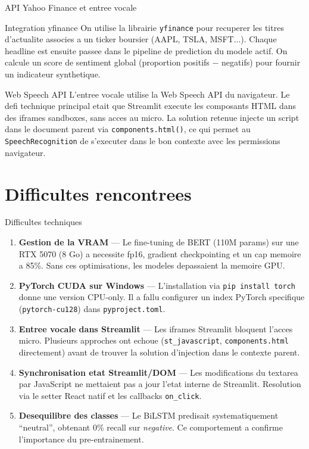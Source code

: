 \documentclass[aspectratio=169, 11pt]{beamer}
\begin{document}
\begin{frame}{API Yahoo Finance et entree vocale}
  \begin{block}{Integration yfinance}
    On utilise la librairie \texttt{yfinance} pour recuperer les titres d'actualite
    associes a un ticker boursier (AAPL, TSLA, MSFT...). Chaque headline est ensuite
    passee dans le pipeline de prediction du modele actif. On calcule un score de
    sentiment global (proportion positifs $-$ negatifs) pour fournir un indicateur
    synthetique.
  \end{block}
  \vspace{0.3cm}
  \begin{block}{Web Speech API}
    L'entree vocale utilise la Web Speech API du navigateur. Le defi technique principal
    etait que Streamlit execute les composants HTML dans des iframes sandboxes, sans
    acces au micro. La solution retenue injecte un script dans le document parent via
    \texttt{components.html()}, ce qui permet au \texttt{SpeechRecognition} de s'executer
    dans le bon contexte avec les permissions navigateur.
  \end{block}
\end{frame}

\section{Difficultes rencontrees}

\begin{frame}{Difficultes techniques}
  \begin{enumerate}
    \item \textbf{Gestion de la VRAM} --- Le fine-tuning de BERT (110M params) sur une
      RTX 5070 (8 Go) a necessite fp16, gradient checkpointing et un cap memoire a 85\%.
      Sans ces optimisations, les modeles depassaient la memoire GPU.
    \item \textbf{PyTorch CUDA sur Windows} --- L'installation via \texttt{pip install torch}
      donne une version CPU-only. Il a fallu configurer un index PyTorch specifique
      (\texttt{pytorch-cu128}) dans \texttt{pyproject.toml}.
    \item \textbf{Entree vocale dans Streamlit} --- Les iframes Streamlit bloquent l'acces
      micro. Plusieurs approches ont echoue (\texttt{st\_javascript}, \texttt{components.html}
      directement) avant de trouver la solution d'injection dans le contexte parent.
    \item \textbf{Synchronisation etat Streamlit/DOM} --- Les modifications du textarea par
      JavaScript ne mettaient pas a jour l'etat interne de Streamlit. Resolution via le
      setter React natif et les callbacks \texttt{on\_click}.
    \item \textbf{Desequilibre des classes} --- Le BiLSTM predisait systematiquement
      ``neutral'', obtenant 0\% recall sur \emph{negative}. Ce comportement a confirme
      l'importance du pre-entrainement.
  \end{enumerate}
\end{frame}
\end{document}
